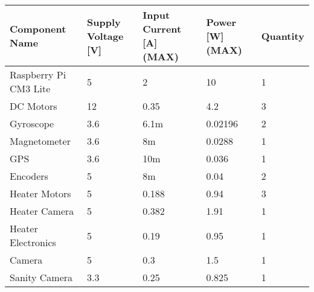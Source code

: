 
\begin{center}
\begin{table}[H]
\begin{tabular}{|m{}|m{}|m{}|m{}|m{}|}
\hline
\textbf{Component Name} & \textbf{Supply Voltage {[}V{]}} & \textbf{Input Current {[}A{]} (MAX)} & \textbf{Power {[}W{]} (MAX)} & \textbf{Quantity} \\ \hline
Raspberry Pi CM3 Lite   & 5                               & 2                                   & 10                           & 1                 \\ \hline
DC Motors               & 12                              & 0.35                                & 4.2                          & 3                 \\ \hline
Gyroscope               & 3.6                             & 6.1m                                & 0.02196                      & 2                 \\ \hline
Magnetometer            & 3.6                             & 8m                                  & 0.0288                       & 1                 \\ \hline
GPS                     & 3.6                             & 10m                                 & 0.036                        & 1                 \\ \hline
Encoders                & 5                               & 8m                                  & 0.04                         & 2                 \\ \hline
Heater Motors           & 5                               & 0.188                               & 0.94                         & 3                 \\ \hline
Heater Camera           & 5                               & 0.382                               & 1.91                         & 1                 \\ \hline
Heater Electronics      & 5                               & 0.19                                & 0.95                         & 1                 \\ \hline
Camera                  & 5                               & 0.3                                 & 1.5                          & 1                 \\ \hline
Sanity Camera           & 3.3                             & 0.25                                & 0.825                        & 1                 \\ \hline

\end{tabular}
\end{table}
\end{center}
